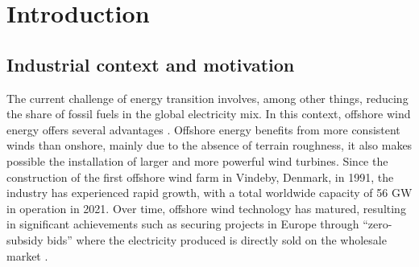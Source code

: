 \cleardoublepage
\chapter*{Introduction}

\section*{Industrial context and motivation}

The current challenge of energy transition involves, among other things, reducing the share of fossil fuels in the global electricity mix. 
In this context, offshore wind energy offers several advantages \citep{eolien_en_mer_2022}. 
Offshore energy benefits from more consistent winds than onshore, mainly due to the absence of terrain roughness, it also makes possible the installation of larger and more powerful wind turbines. 
Since the construction of the first offshore wind farm in Vindeby, Denmark, in 1991, the industry has experienced rapid growth, with a total worldwide capacity of 56 GW in operation in 2021. 
Over time, offshore wind technology has matured, resulting in significant achievements such as securing projects in Europe through ``zero-subsidy bids'' where the electricity produced is directly sold on the wholesale market \citep{eolien_en_mer_2022}. 

